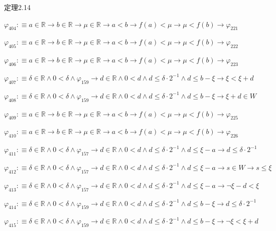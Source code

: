 \begin{fullproof}{定理2.14}
\begin{abbrevlist}
\item $\varphi_{404} :\equiv a \in \mathbb{R} \to b \in \mathbb{R} \to \mu \in \mathbb{R} \to a < b \to f(a) < \mu \to \mu < f(b) \to \varphi_{221}$
\item $\varphi_{405} :\equiv a \in \mathbb{R} \to b \in \mathbb{R} \to \mu \in \mathbb{R} \to a < b \to f(a) < \mu \to \mu < f(b) \to \varphi_{222}$
\item $\varphi_{406} :\equiv a \in \mathbb{R} \to b \in \mathbb{R} \to \mu \in \mathbb{R} \to a < b \to f(a) < \mu \to \mu < f(b) \to \varphi_{223}$
\item $\varphi_{407} :\equiv \delta \in \mathbb{R} \land 0 < \delta \land \varphi_{159} \to d \in \mathbb{R} \land 0 < d \land d \leq \delta \cdot 2^{-1} \land d \leq b - \xi \to \xi < \xi + d$
\item $\varphi_{408} :\equiv \delta \in \mathbb{R} \land 0 < \delta \land \varphi_{159} \to d \in \mathbb{R} \land 0 < d \land d \leq \delta \cdot 2^{-1} \land d \leq b - \xi \to \xi + d \in W$
\item $\varphi_{409} :\equiv a \in \mathbb{R} \to b \in \mathbb{R} \to \mu \in \mathbb{R} \to a < b \to f(a) < \mu \to \mu < f(b) \to \varphi_{225}$
\item $\varphi_{410} :\equiv a \in \mathbb{R} \to b \in \mathbb{R} \to \mu \in \mathbb{R} \to a < b \to f(a) < \mu \to \mu < f(b) \to \varphi_{226}$
\item $\varphi_{411} :\equiv \delta \in \mathbb{R} \land 0 < \delta \land \varphi_{157} \to d \in \mathbb{R} \land 0 < d \land d \leq \delta \cdot 2^{-1} \land d \leq \xi - a \to d \leq \delta \cdot 2^{-1}$
\item $\varphi_{412} :\equiv \delta \in \mathbb{R} \land 0 < \delta \land \varphi_{157} \to d \in \mathbb{R} \land 0 < d \land d \leq \delta \cdot 2^{-1} \land d \leq \xi - a \to s \in W \to s \leq \xi$
\item $\varphi_{413} :\equiv \delta \in \mathbb{R} \land 0 < \delta \land \varphi_{157} \to d \in \mathbb{R} \land 0 < d \land d \leq \delta \cdot 2^{-1} \land d \leq \xi - a \to \neg \xi - d < \xi$
\item $\varphi_{414} :\equiv \delta \in \mathbb{R} \land 0 < \delta \land \varphi_{159} \to d \in \mathbb{R} \land 0 < d \land d \leq \delta \cdot 2^{-1} \land d \leq b - \xi \to d \leq \delta \cdot 2^{-1}$
\item $\varphi_{415} :\equiv \delta \in \mathbb{R} \land 0 < \delta \land \varphi_{159} \to d \in \mathbb{R} \land 0 < d \land d \leq \delta \cdot 2^{-1} \land d \leq b - \xi \to \neg \xi < \xi + d$

\end{abbrevlist}
\end{fullproof}
